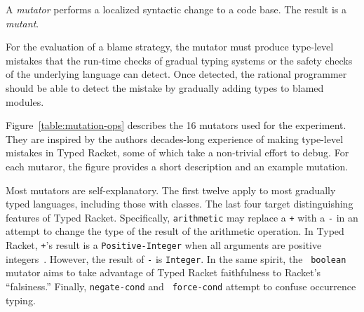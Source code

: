 
A {\it mutator\/} performs a localized syntactic change to a code base. The
result is a {\em mutant\/}.

For the evaluation of a blame strategy, the mutator must produce type-level
mistakes that the run-time checks of gradual typing systems or the safety
checks of the underlying language can detect. Once detected, the rational
programmer should be able to detect the mistake by gradually adding types to
blamed modules.

Figure~\ref{table:mutation-ops} describes the 16 mutators used for the
experiment.  They are inspired by the authors decades-long experience
of making type-level mistakes in Typed Racket, some of which take a
non-trivial effort to debug.  For each mutaror, the figure provides a
short description and an example mutation.

Most mutators are self-explanatory.  The first twelve apply to most
gradually typed languages, including those with classes.  The last
four target distinguishing features of Typed Racket.  Specifically,
{\tt arithmetic} may replace a {\tt +} with a {\tt -} in an attempt to
change the type of the result of the arithmetic operation. In Typed
Racket, {\tt +}'s result is a {\tt Positive-Integer} when all
arguments are positive integers~\cite{stathff-padl-12}. However, the
result of {\tt -} is {\tt Integer}. In the same spirit, the {\tt
boolean} mutator aims to take advantage of Typed Racket faithfulness
to Racket's ``falsiness.'' Finally, {\tt negate-cond} and {\tt
force-cond} attempt to confuse occurrence typing.
